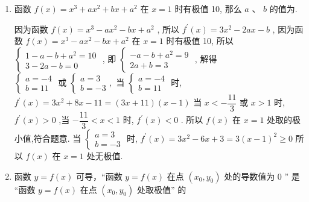 \begin{enumerate}
    \item 函数 $f\left( x\right)  = {x}^{3} + a{x}^{2} + {bx} + {a}^{2}$ 在 $x = 1$ 时有极值 10, 那么 $a$ 、 $b$ 的值为.
    \begin{jieda}
        因为函数 $f\left( x\right)  = {x}^{3} - a{x}^{2} - {bx} + {a}^{2}$ ,
        所以 ${f}^{\prime }\left( x\right)  = 3{x}^{2} - {2ax} - b$ ,
        因为函数 $f\left( x\right)  = {x}^{3} - a{x}^{2} - {bx} + {a}^{2}$ 在 $x = 1$ 时有极值 10,
        所以 $\left\{  \begin{array}{l} 1 - a - b + {a}^{2} = {10} \\  3 - {2a} - b = 0 \end{array}\right.$ ,
        即 $\left\{  \begin{array}{l}  - a - b + a^2 = 9 \\  {2a} + b = 3 \end{array}\right.$ ,
        解得 $\left\{  {\begin{array}{l} a =  - 4 \\  b = {11} \end{array}\text{ 或 }\left\{  {\begin{array}{l} a = 3 \\  b =  - 3 \end{array},}\right. }\right.$
        当 $\left\{  \begin{array}{l} a =  - 4 \\  b = {11} \end{array}\right.$ 时, ${f}^{\prime }\left( x\right)  = 3{x}^{2} + {8x} - {11} = \left( {{3x} + {11}}\right) \left( {x - 1}\right)$
        当 $x <  - \dfrac{11}{3}$ 或 $x > 1$ 时, ${f}^{\prime }\left( x\right)  > 0$ ,当 $- \dfrac{11}{3} < x < 1$ 时, ${f}^{\prime }\left( x\right)  < 0$ .
        所以 $f\left( x\right)$ 在 $x = 1$ 处取的极小值,符合题意.
        当 $\left\{  \begin{array}{l} a = 3 \\  b =  - 3 \end{array}\right.$ 时, ${f}^{\prime }\left( x\right)  = 3{x}^{2} - {6x} + 3 = 3{\left( x - 1\right) }^{2} \geq  0$
        所以 $f\left( x\right)$ 在 $x = 1$ 处无极值.
    \end{jieda}
    
    \item 函数 $y = f\left( x\right)$ 可导，“函数 $y = f\left( x\right)$ 在点 $\left( {{x}_{0},{y}_{0}}\right)$ 处的导数值为 0 ” 是 “函数 $y = f\left( x\right)$ 在点 $\left( {{x}_{0},{y}_{0}}\right)$ 处取极值” 的
    

\end{enumerate}
